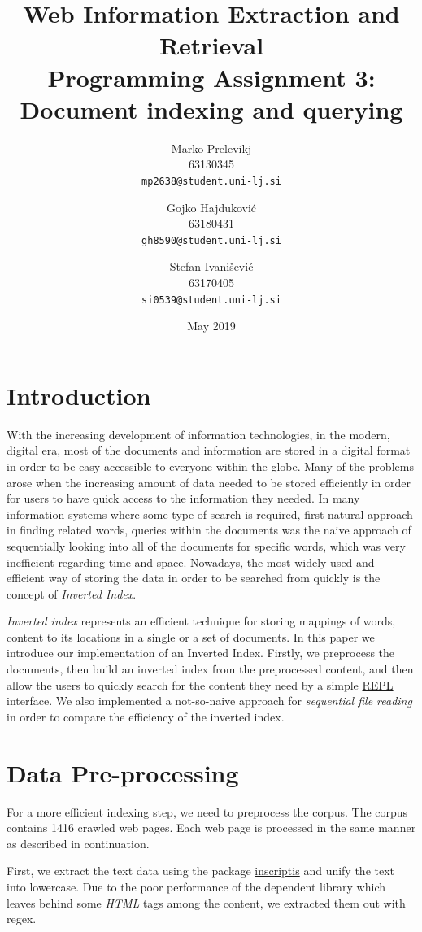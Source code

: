 \documentclass{article}
\title{
	Web Information Extraction and Retrieval\\
	Programming Assignment 3: \\
	Document indexing and querying
}
\author{
	Marko Prelevikj\\
	63130345\\
	\texttt{mp2638@student.uni-lj.si}
	\and
	Gojko Hajduković\\
	63180431\\
	\texttt{gh8590@student.uni-lj.si}
	\and
	Stefan Ivanišević\\
	63170405\\
	\texttt{si0539@student.uni-lj.si}
}
\date{May 2019}
\begin{document}
	
	\maketitle
	\section{Introduction}
	With the increasing development of information technologies, in the modern, digital era, most of the documents and information are stored in a digital format in order to be easy accessible to everyone within the globe. Many of the problems arose when the increasing amount of data needed to be stored efficiently in order for users to have quick access to the information they needed. In many information systems where some type of search is required, first natural approach in finding related words, queries within the documents was the naive approach of sequentially looking into all of the documents for specific words, which was very inefficient regarding time and space. Nowadays, the most widely used and efficient way of storing the data in order to be searched from quickly is the concept of \textit{Inverted Index}.
	
	\textit{Inverted index} represents an efficient technique for storing mappings of words, content to its locations in a single or a set of documents. In this paper we introduce our implementation of an Inverted Index. Firstly, we preprocess the documents, then build an inverted index from the preprocessed content, and then allow the users to quickly search for the content they need by a simple \href{https://en.wikipedia.org/wiki/Read%E2%80%93eval%E2%80%93print_loop}{ REPL} interface. We also implemented a not-so-naive approach for \textit{sequential file reading} in order to compare the efficiency of the inverted index.
	
	\section{Data Pre-processing} \label{sec:Preprocess}
	For a more efficient indexing step, we need to preprocess the corpus. The corpus contains 1416 crawled web pages. Each web page is processed in the same manner as described in continuation.
	
	First, we extract the text data using the package \href{https://pypi.org/project/inscriptis/}{inscriptis} and unify the text into lowercase. Due to the poor performance of the dependent library which leaves behind some \textit{HTML} tags among the content, we extracted them out with regex.
	
\end{document}
